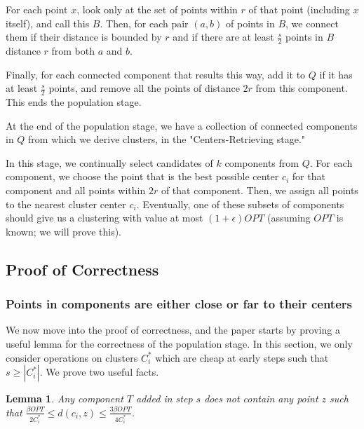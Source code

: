 \documentclass[paper=a4, fontsize=10.5pt]{scrartcl} %
\numberwithin{equation}{section} %
\numberwithin{figure}{section} %
\numberwithin{table}{section} %
\newtheorem{lemma}[theorem]{Lemma}
\begin{document}
For each point $x$, look only at the set of points within $r$ of that point (including $x$ itself), and call this $B$.  Then, for each pair $(a, b)$ of points in $B$, we connect them if their distance is bounded by $r$ and if there are at least $\frac{s}{2}$ points in $B$ distance $r$ from both $a$ and $b$.

Finally, for each connected component that results this way, add it to $Q$ if it has at least $\frac{s}{2}$ points, and remove all the points of distance $2r$ from this component.  This ends the population stage.


At the end of the population stage, we have a collection of connected components in $Q$ from which we derive clusters, in the "Centers-Retrieving stage."

In this stage, we continually select candidates of $k$ components from $Q$.  For each component, we choose the point that is the best possible center $c_i$ for that component and all points within $2r$ of that component.  Then, we assign all points to the nearest cluster center $c_i$.  Eventually, one of these subsets of components should give us a clustering with value at most $(1 + \epsilon) OPT$ (assuming $OPT$ is known; we will prove this).

\subsection{Proof of Correctness}

\subsubsection{Points in components are either close or far to their centers}
We now move into the proof of correctness, and the paper starts by proving a useful lemma for the correctness of the population stage.  In this section, we only consider operations on clusters $C^*_i$ which are cheap at early steps such that $s \geq |C^*_i|$.  We prove two useful facts.

\begin{lemma}
Any component $T$ added in step $s$ does not contain any point $z$ such that $\frac{\beta OPT}{2 C^*_i} \leq  d(c_i, z) \leq \frac{3 \beta OPT}{4 C^*_i}$.
\label{lemma:4.2a}
\end{lemma}
\end{document}
